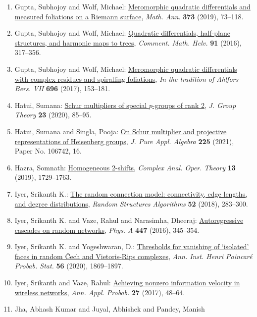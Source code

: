 \begin{enumerate}
\item Gupta, Subhojoy and Wolf, Michael: \href{https://doi.org/10.1007/s00208-018-1674-z}{Meromorphic quadratic differentials and measured foliations on
a {R}iemann surface}, \emph{Math. Ann.} {\bf 373} (2019), 73--118.
\item Gupta, Subhojoy and Wolf, Michael: \href{https://doi.org/10.4171/CMH/388}{Quadratic differentials, half-plane structures, and harmonic
maps to trees}, \emph{Comment. Math. Helv.} {\bf 91} (2016), 317--356.
\item Gupta, Subhojoy and Wolf, Michael: \href{https://doi.org/10.1090/conm/696/14021}{Meromorphic quadratic differentials with complex residues and
spiralling foliations}, \emph{In the tradition of {A}hlfors-{B}ers. {VII}} {\bf 696} (2017), 153--181.
\item Hatui, Sumana: \href{https://doi.org/10.1515/jgth-2019-0045}{Schur multipliers of special {$p$}-groups of rank 2}, \emph{J. Group Theory} {\bf 23} (2020), 85--95.
\item Hatui, Sumana and Singla, Pooja: \href{https://doi.org/10.1016/j.jpaa.2021.106742}{On {S}chur multiplier and projective representations of
{H}eisenberg groups}, \emph{J. Pure Appl. Algebra} {\bf 225} (2021), Paper No. 106742, 16.
\item Hazra, Somnath: \href{https://doi.org/10.1007/s11785-018-0822-5}{Homogeneous 2-shifts}, \emph{Complex Anal. Oper. Theory} {\bf 13} (2019), 1729--1763.
\item Iyer, Srikanth K.: \href{https://doi.org/10.1002/rsa.20741}{The random connection model: connectivity, edge lengths, and
degree distributions}, \emph{Random Structures Algorithms} {\bf 52} (2018), 283--300.
\item Iyer, Srikanth K. and Vaze, Rahul and Narasimha, Dheeraj: \href{https://doi.org/10.1016/j.physa.2015.12.030}{Autoregressive cascades on random networks}, \emph{Phys. A} {\bf 447} (2016), 345--354.
\item Iyer, Srikanth K. and Yogeshwaran, D.: \href{https://doi.org/10.1214/19-AIHP1020}{Thresholds for vanishing of `isolated' faces in random \v{C}ech
and {V}ietoris-{R}ips complexes}, \emph{Ann. Inst. Henri Poincar\'{e} Probab. Stat.} {\bf 56} (2020), 1869--1897.
\item Iyer, Srikanth and Vaze, Rahul: \href{https://doi.org/10.1214/16-AAP1196}{Achieving nonzero information velocity in wireless networks}, \emph{Ann. Appl. Probab.} {\bf 27} (2017), 48--64.
\item Jha, Abhash Kumar and Juyal, Abhishek and Pandey, Manish

\end{enumerate}
